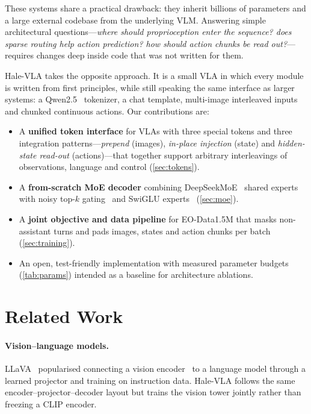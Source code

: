 \documentclass[11pt]{article}
\begin{document}
These systems share a practical drawback: they inherit billions of parameters and a large
external codebase from the underlying VLM. Answering simple architectural
questions---\emph{where should proprioception enter the sequence? does sparse routing help
action prediction? how should action chunks be read out?}---requires changes deep inside
code that was not written for them.

Hale-VLA takes the opposite approach. It is a small VLA in which every module is written
from first principles, while still speaking the same interface as larger systems: a
Qwen2.5~\cite{qwen2025qwen25} tokenizer, a chat template, multi-image interleaved inputs and
chunked continuous actions. Our contributions are:
\begin{itemize}
  \item A \textbf{unified token interface} for VLAs with three special tokens and three
        integration patterns---\emph{prepend} (images), \emph{in-place injection}
        (state) and \emph{hidden-state read-out} (actions)---that together support
        arbitrary interleavings of observations, language and control (\cref{sec:tokens}).
  \item A \textbf{from-scratch MoE decoder} combining DeepSeekMoE~\cite{dai2024deepseekmoe}
        shared experts with noisy top-$k$ gating~\cite{shazeer2017outrageously} and SwiGLU
        experts~\cite{shazeer2020glu} (\cref{sec:moe}).
  \item A \textbf{joint objective and data pipeline} for EO-Data1.5M that masks non-assistant
        turns and pads images, states and action chunks per batch (\cref{sec:training}).
  \item An open, test-friendly implementation with measured parameter budgets
        (\cref{tab:params}) intended as a baseline for architecture ablations.
\end{itemize}

\section{Related Work}

\paragraph{Vision--language models.} LLaVA~\cite{liu2023llava} popularised connecting a
vision encoder~\cite{dosovitskiy2021vit} to a language model through a learned projector and
training on instruction data. Hale-VLA follows the same encoder--projector--decoder layout
but trains the vision tower jointly rather than freezing a CLIP encoder.
\end{document}
